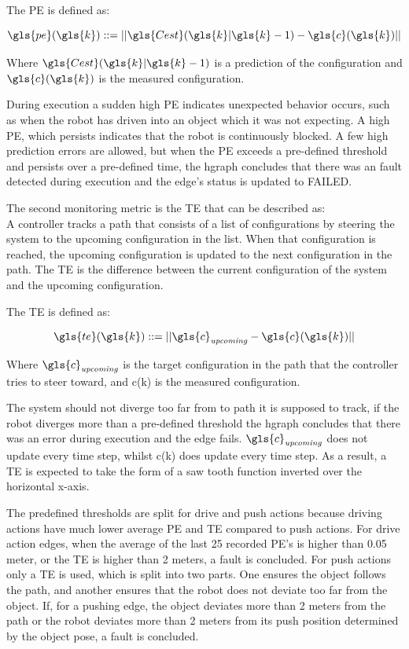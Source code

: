 The \ac{PE} is defined as:

\[ \gls{pe}(\gls{k}) ::= ||\gls{Cest}(\gls{k}|\gls{k}-1) - \gls{c}(\gls{k})|| \]

Where $\gls{Cest}(\gls{k}|\gls{k}-1)$ is a prediction of the configuration and $\gls{c}(\gls{k})$ is the measured configuration.\bs

During execution a sudden high \ac{PE} indicates unexpected behavior occurs, such as when the robot has driven into an object which it was not expecting. A high \ac{PE}, which persists indicates that the robot is continuously blocked. A few high prediction errors are allowed, but when the \ac{PE} exceeds a pre-defined threshold and persists over a pre-defined time, the \ac{hgraph} concludes that there was an fault detected during execution and the edge's status is updated to FAILED.\bs

The second monitoring metric is the \acl{TE} that can be described as:\\ A controller tracks a path that consists of a list of configurations by steering the system to the upcoming configuration in the list. When that configuration is reached, the upcoming configuration is updated to the next configuration in the path. The \ac{TE} is the difference between the current configuration of the system and the upcoming configuration.\bs

The \ac{TE} is defined as:

\[ \gls{te}(\gls{k}) ::= ||\gls{c}_\mathit{upcoming} - \gls{c}(\gls{k})|| \]

Where $\gls{c}_\mathit{upcoming}$ is the target configuration in the path that the controller tries to steer toward, and \gls{c}(\gls{k}) is the measured configuration.\bs

The system should not diverge too far from to path it is supposed to track, if the robot diverges more than a pre-defined threshold the \ac{hgraph} concludes that there was an error during execution and the edge fails. $\gls{c}_\mathit{upcoming}$ does not update every time step, whilst \gls{c}(\gls{k}) does update every time step. As a result, a  \ac{TE} is expected to take the form of a saw tooth function inverted over the horizontal x-axis.\bs

The predefined thresholds are split for drive and push actions because driving actions have much lower average \ac{PE} and \ac{TE} compared to push actions. For drive action edges, when the average of the last 25 recorded \ac{PE}'s is higher than 0.05 meter, or the \ac{TE} is higher than 2 meters, a fault is concluded. For push actions only a \ac{TE} is used, which is split into two parts. One ensures the object follows the path, and another ensures that the robot does not deviate too far from the object. If, for a pushing edge, the object deviates more than 2 meters from the path or the robot deviates more than 2 meters from its push position determined by the object pose, a fault is concluded.\bs

